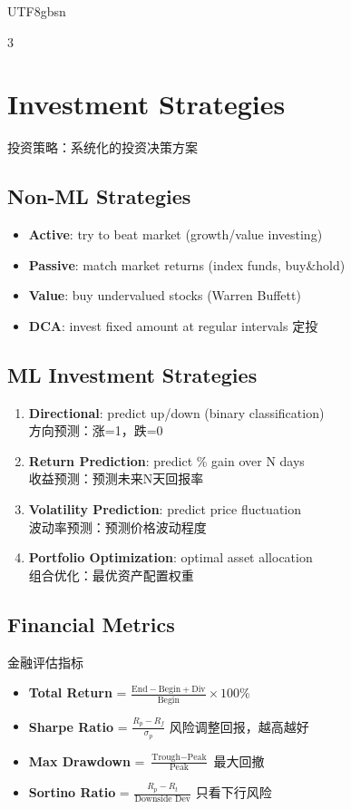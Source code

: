 \documentclass[9pt,landscape,a4paper]{article}
\newcommand{\zhint}[1]{{\scriptsize\color{gray!70!black}#1}}
\begin{document}
\begin{CJK}{UTF8}{gbsn}
\begin{multicols}{3}
\section{Investment Strategies}
\zhint{投资策略：系统化的投资决策方案}

\subsection{Non-ML Strategies}
\begin{itemize}[leftmargin=8pt,itemsep=0pt,topsep=0pt]
\item \textbf{Active}: try to beat market (growth/value investing)
\item \textbf{Passive}: match market returns (index funds, buy\&hold)
\item \textbf{Value}: buy undervalued stocks (Warren Buffett)
\item \textbf{DCA}: invest fixed amount at regular intervals \zhint{定投}
\end{itemize}

\subsection{ML Investment Strategies}
\begin{enumerate}[leftmargin=10pt,itemsep=0pt,topsep=0pt]
\item \textbf{Directional}: predict up/down (binary classification)\\
\zhint{方向预测：涨=1，跌=0}
\item \textbf{Return Prediction}: predict \% gain over N days\\
\zhint{收益预测：预测未来N天回报率}
\item \textbf{Volatility Prediction}: predict price fluctuation\\
\zhint{波动率预测：预测价格波动程度}
\item \textbf{Portfolio Optimization}: optimal asset allocation\\
\zhint{组合优化：最优资产配置权重}
\end{enumerate}

\subsection{Financial Metrics}
\zhint{金融评估指标}
\begin{itemize}[leftmargin=8pt,itemsep=0pt,topsep=0pt]
\item \textbf{Total Return} = $\frac{\text{End} - \text{Begin} + \text{Div}}{\text{Begin}} \times 100\%$
\item \textbf{Sharpe Ratio} = $\frac{R_p - R_f}{\sigma_p}$ \zhint{风险调整回报，越高越好}
\item \textbf{Max Drawdown} = $\frac{\text{Trough} - \text{Peak}}{\text{Peak}}$ \zhint{最大回撤}
\item \textbf{Sortino Ratio} = $\frac{R_p - R_t}{\text{Downside Dev}}$ \zhint{只看下行风险}
\end{itemize}


\end{multicols}
\end{CJK}
\end{document}
